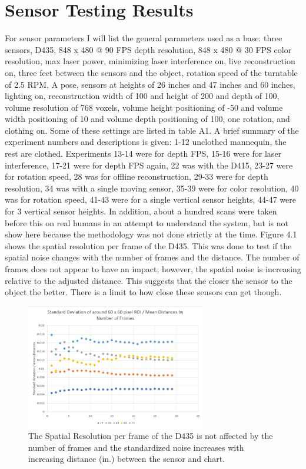 \section{Sensor Testing Results}
For sensor parameters I will list the general parameters used as a base: three sensors, D435, 848 x 480 @ 90 FPS depth resolution, 848 x 480 @ 30 FPS color resolution, max laser power, minimizing laser interference on, live reconstruction on, three feet between the sensors and the object, rotation speed of the turntable of 2.5 RPM, A pose, sensors at heights of 26 inches and 47 inches and 60 inches, lighting on, reconstruction width of 100 and height of 200 and depth of 100, volume resolution of 768 voxels, volume height positioning of -50 and volume width positioning of 10 and volume depth positioning of 100, one rotation, and clothing on. Some of these settings are listed in table A1. A brief summary of the experiment numbers and descriptions is given: 1-12 unclothed mannequin, the rest are clothed. Experiments 13-14 were for depth FPS, 15-16 were for laser interference, 17-21 were for depth FPS again, 22 was with the D415, 23-27 were for rotation speed, 28 was for offline reconstruction, 29-33 were for depth resolution, 34 was with a single moving sensor, 35-39 were for color resolution, 40 was for rotation speed, 41-43 were for a single vertical sensor heights, 44-47 were for 3 vertical sensor heights. In addition, about a hundred scans were taken before this on real humans in an attempt to understand the system, but is not show here because the methodology was not done strictly at the time. 
Figure 4.1 shows the spatial resolution per frame of the D435. This was done to test if the spatial noise changes with the number of frames and the distance. The number of frames does not appear to have an impact; however, the spatial noise is increasing relative to the adjusted distance. This suggests that the closer the sensor to the object the better. There is a limit to how close these sensors can get though.
\begin{figure}[!htb]
	\caption{The Spatial Resolution per frame of the D435 is not affected by the number of frames and the standardized noise increases with increasing distance (in.) between the sensor and chart.}
	\centering
	\includegraphics[width=0.7\textwidth]{images/D435_spatial_resolution.png}
\end{figure}

